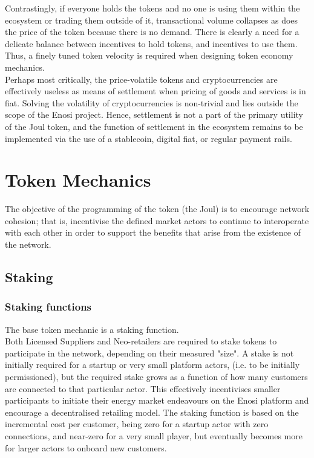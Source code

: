 \documentclass{article}
\theoremstyle{definition}
\theoremstyle{plain} %
\begin{document}
\noindent Contrastingly, if everyone holds the tokens and no one is using them within the ecosystem or trading them outside of it, transactional volume collapses as does the price of the token because there is no demand. There is clearly a need for a delicate balance between incentives to hold tokens, and incentives to use them. Thus, a finely tuned token velocity is required when designing token economy mechanics.\\

\noindent Perhaps most critically, the price-volatile tokens and cryptocurrencies are effectively useless as means of settlement when pricing of goods and services is in fiat. Solving the volatility of cryptocurrencies is non-trivial and lies outside the scope of the Enosi project. Hence, settlement is not a part of the primary utility of the Joul token, and the function of settlement in the ecosystem remains to be implemented via the use of a stablecoin, digital fiat, or regular payment rails.



\pagebreak
\section{Token Mechanics}

\noindent The objective of the programming of the token (the Joul) is to encourage network cohesion; that is, incentivise the defined market actors to continue to interoperate with each other in order to support the benefits that arise from the existence of the network.

\subsection{Staking}

\subsubsection{Staking functions}

\noindent The base token mechanic is a staking function. \\

\noindent Both Licensed Suppliers and Neo-retailers are required to stake tokens to participate in the network, depending on their measured "size". A stake is not initially required for a startup or very small platform actors, (i.e. to be initially permissioned), but the required stake grows as a function of how many customers are connected to that particular actor. This effectively incentivises smaller participants to initiate their energy market endeavours on the Enosi platform and encourage a decentralised retailing model. The staking function is based on the incremental cost per customer, being zero for a startup actor with zero connections, and near-zero for a very small player, but eventually becomes more for larger actors to onboard new customers. \\
\end{document}

